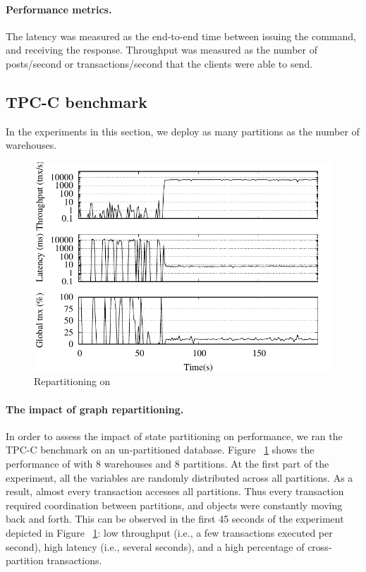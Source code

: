 \paragraph*{Performance metrics.}
%
The latency was measured as the end-to-end time between issuing the
command, and receiving the response.  Throughput was measured as the
number of posts/second or transactions/second that the clients were able to send.

\subsection{TPC-C benchmark}
\label{sec:evaluation:tpc-c}

In the experiments in this section, we deploy as many partitions as the number of warehouses.

\begin{figure}[ht!]
  \centering
    \includegraphics[width=\columnwidth]{figures/experiments/tpcc-repartitioning/tpcc-repartitioning}
  \caption{Repartitioning on \dynastar}
  \label{fig:tpcc_repartitioning}
\end{figure}

\paragraph{The impact of graph repartitioning.}
In order to assess the impact of state partitioning on performance, we ran the TPC-C benchmark on an un-partitioned database.  Figure ~\ref{fig:tpcc_repartitioning} 
shows the performance of \dynastar with 8 warehouses and 8 partitions.
At the first part of the experiment, all the variables are randomly distributed across all partitions.
As a result, almost every transaction accesses all partitions. Thus every transaction 
required coordination between partitions, and objects were constantly moving back and forth. 
This can be observed in the first 45 seconds of the experiment depicted in Figure ~\ref{fig:tpcc_repartitioning}: low throughput (i.e., a few transactions executed per second), high latency (i.e., several seconds), and a high percentage of cross-partition transactions.

